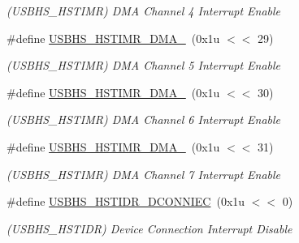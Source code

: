 \begin{DoxyCompactItemize}
\begin{DoxyCompactList}\small\item\em (U\+S\+B\+H\+S\+\_\+\+H\+S\+T\+I\+MR) D\+MA Channel 4 Interrupt Enable \end{DoxyCompactList}\item 
\mbox{\label{group__SAMS70__USBHS_ga9ee1fd964c3d000bae0a979ebf13e123}} 
\#define \mbox{\hyperlink{group__SAMS70__USBHS_ga9ee1fd964c3d000bae0a979ebf13e123}{U\+S\+B\+H\+S\+\_\+\+H\+S\+T\+I\+M\+R\+\_\+\+D\+M\+A\+\_}}~(0x1u $<$$<$ 29)
\begin{DoxyCompactList}\small\item\em (U\+S\+B\+H\+S\+\_\+\+H\+S\+T\+I\+MR) D\+MA Channel 5 Interrupt Enable \end{DoxyCompactList}\item 
\mbox{\label{group__SAMS70__USBHS_gaf450dc1e38656073c51bdb2d455a4d01}} 
\#define \mbox{\hyperlink{group__SAMS70__USBHS_gaf450dc1e38656073c51bdb2d455a4d01}{U\+S\+B\+H\+S\+\_\+\+H\+S\+T\+I\+M\+R\+\_\+\+D\+M\+A\+\_}}~(0x1u $<$$<$ 30)
\begin{DoxyCompactList}\small\item\em (U\+S\+B\+H\+S\+\_\+\+H\+S\+T\+I\+MR) D\+MA Channel 6 Interrupt Enable \end{DoxyCompactList}\item 
\mbox{\label{group__SAMS70__USBHS_ga0a10247b930f6ffcc7deb2e894fe86d3}} 
\#define \mbox{\hyperlink{group__SAMS70__USBHS_ga0a10247b930f6ffcc7deb2e894fe86d3}{U\+S\+B\+H\+S\+\_\+\+H\+S\+T\+I\+M\+R\+\_\+\+D\+M\+A\+\_}}~(0x1u $<$$<$ 31)
\begin{DoxyCompactList}\small\item\em (U\+S\+B\+H\+S\+\_\+\+H\+S\+T\+I\+MR) D\+MA Channel 7 Interrupt Enable \end{DoxyCompactList}\item 
\mbox{\label{group__SAMS70__USBHS_gae12d73aff52d4e956f581bcf23f118f3}} 
\#define \mbox{\hyperlink{group__SAMS70__USBHS_gae12d73aff52d4e956f581bcf23f118f3}{U\+S\+B\+H\+S\+\_\+\+H\+S\+T\+I\+D\+R\+\_\+\+D\+C\+O\+N\+N\+I\+EC}}~(0x1u $<$$<$ 0)
\begin{DoxyCompactList}\small\item\em (U\+S\+B\+H\+S\+\_\+\+H\+S\+T\+I\+DR) Device Connection Interrupt Disable \end{DoxyCompactList}\item 

\end{DoxyCompactItemize}
